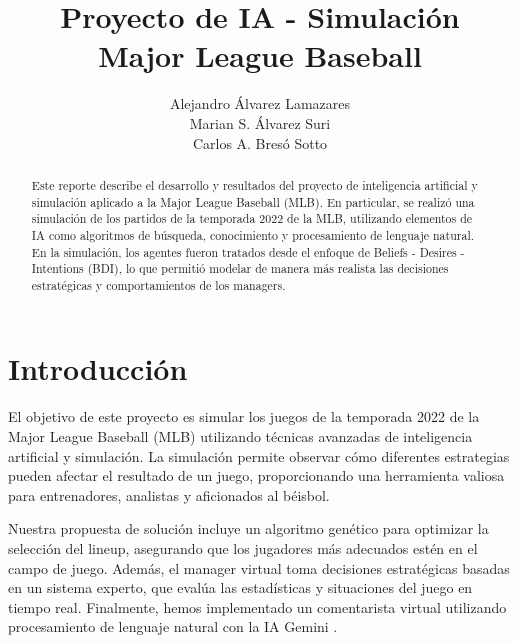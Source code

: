 \documentclass[runningheads]{llncs}
\begin{document}
\title{Proyecto de IA - Simulación \\
        Major League Baseball}

\author{Alejandro Álvarez Lamazares \\
        Marian S. Álvarez Suri \\
        Carlos A. Bresó Sotto
        }



\maketitle

\begin{abstract}
    Este reporte describe el desarrollo y resultados del proyecto de inteligencia artificial y simulación aplicado a la Major League Baseball (MLB). En particular, se realizó una simulación de los partidos de la temporada 2022 de la MLB, utilizando elementos de IA como algoritmos de búsqueda, conocimiento y procesamiento de lenguaje natural. En la simulación, los agentes fueron tratados desde el enfoque de Beliefs - Desires - Intentions (BDI), lo que permitió modelar de manera más realista las decisiones estratégicas y comportamientos de los managers.
\end{abstract}

\section{Introducción}
    El objetivo de este proyecto es simular los juegos de la temporada 2022 de la Major League Baseball (MLB) \cite{mlb} utilizando técnicas avanzadas de inteligencia artificial y simulación. La simulación permite observar cómo diferentes estrategias pueden afectar el resultado de un juego, proporcionando una herramienta valiosa para entrenadores, analistas y aficionados al béisbol.
    
    Nuestra propuesta de solución incluye un algoritmo genético para optimizar la selección del lineup, asegurando que los jugadores más adecuados estén en el campo de juego. Además, el manager virtual toma decisiones estratégicas basadas en un sistema experto, que evalúa las estadísticas y situaciones del juego en tiempo real. Finalmente, hemos implementado un comentarista virtual utilizando procesamiento de lenguaje natural con la IA Gemini \cite{gemini}.
\end{document}
